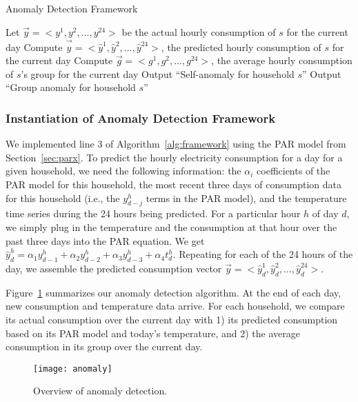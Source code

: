 \documentclass[prodmode,acmtods]{acmsmall}
\begin{document}
\begin{algorithm}[t]
\caption{Anomaly Detection Framework}
\label{alg:framework}
 {
Let $\vec{y}=<y^1, y^2, \ldots, y^{24}>$ be the actual hourly consumption of $s$ for the current day\;
Compute $\vec{\hat{y}}=<\hat{y}^1, \hat{y}^2, \ldots, \hat{y}^{24}>$, the predicted hourly consumption of $s$ for the current day\;
Compute $\vec{g}=<g^1, g^2, \ldots, g^{24}>$, the average hourly consumption of $s$'s group for the current day\;
 {
	Output ``Self-anomaly for household $s$''\;
}
 {
	Output ``Group anomaly for household $s$''\;
}
}
\end{algorithm}

\subsubsection{Instantiation of Anomaly Detection Framework}
\label{sec:anomaly_det_inst}

We implemented line 3 of Algorithm~\ref{alg:framework} using the PAR model from Section~\ref{sec:parx}.  To predict the hourly electricity consumption for a day for a given household, we need the following information: the $\alpha_i$ coefficients of the PAR model for this household, the most recent three days of consumption data for this household (i.e., the $y^h_{d-j}$ terms in the PAR model), and the temperature time series during the 24 hours being predicted.  For a particular hour $h$ of day $d$, we simply plug in the temperature and the consumption at that hour over the past three days into the PAR equation.  We get $\hat{y}^h_d = \alpha_1 y^h_{d-1} + \alpha_2 y^h_{d-2} + \alpha_3 y^h_{d-3} + \alpha_4 t^h_d$.  Repeating for each of the 24 hours of the day, we assemble the predicted consumption vector $\vec{y} = <\hat{y}^1_d, \hat{y}^2_d, \ldots, \hat{y}^{24}_d>$.

Figure~\ref{fig:anomaly} summarizes our anomaly detection algorithm.  At the end of each day, new consumption and temperature data arrive.  For each household, we compare its actual consumption over the current day with 1) its predicted consumption based on its PAR model and today's temperature, and 2) the average consumption in its group over the current day.

\begin{figure}[t]
  \centering
 \texttt{[image: anomaly]}
 \vspace{-70pt}
  \caption{Overview of anomaly detection.}
  \label{fig:anomaly} 
\end{figure}
\end{document}

